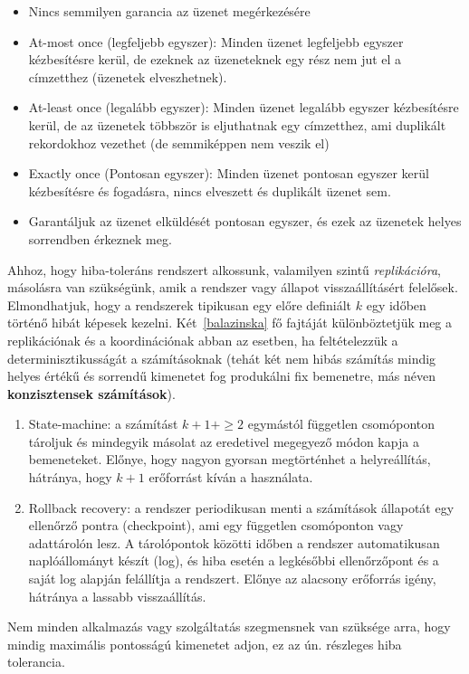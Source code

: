 \documentclass[a4paper,12pt]{article}
\begin{document}
\begin{itemize}
\item Nincs semmilyen garancia az üzenet megérkezésére
\item At-most once (legfeljebb egyszer): Minden üzenet legfeljebb egyszer kézbesítésre kerül, de ezeknek az üzeneteknek egy rész nem jut el a címzetthez (üzenetek elveszhetnek).
\item At-least once (legalább egyszer): Minden üzenet legalább egyszer kézbesítésre kerül, de az üzenetek többször is eljuthatnak egy címzetthez, ami duplikált rekordokhoz vezethet (de semmiképpen nem veszik el)
\item Exactly once (Pontosan egyszer): Minden üzenet pontosan egyszer kerül kézbesítésre és fogadásra, nincs elveszett és duplikált üzenet sem.
\item Garantáljuk az üzenet elküldését pontosan egyszer, és ezek az üzenetek helyes sorrendben érkeznek meg.
\end{itemize}

Ahhoz, hogy hiba-toleráns rendszert alkossunk, valamilyen szintű \textit{replikációra}, másolásra van szükségünk, amik a rendszer vagy állapot visszaállításért felelősek. Elmondhatjuk, hogy a rendszerek tipikusan egy előre definiált $k$ egy időben történő hibát képesek kezelni. Két~\ref{balazinska} fő fajtáját különböztetjük meg a replikációnak és a koordinációnak abban az esetben, ha feltételezzük a determinisztikusságát a számításoknak (tehát két nem hibás számítás mindig helyes értékű és sorrendű kimenetet fog produkálni fix bemenetre, más néven \textbf{konzisztensek számítások}). 

\begin{enumerate}
\item State-machine: a számítást $k+1+\ge2$ egymástól független csomóponton tároljuk és mindegyik másolat az eredetivel megegyező módon kapja a bemeneteket. Előnye, hogy nagyon gyorsan megtörténhet a helyreállítás, hátránya, hogy $k+1$ erőforrást kíván a használata.
\item Rollback recovery: a rendszer periodikusan menti a számítások állapotát egy ellenőrző pontra (checkpoint), ami egy független csomóponton vagy adattárolón lesz. A tárolópontok közötti időben a rendszer automatikusan naplóállományt készít (log), és hiba esetén a legkésőbbi ellenőrzőpont és a saját log alapján felállítja a rendszert. Előnye az alacsony erőforrás igény, hátránya a lassabb visszaállítás. 
\end{enumerate}

Nem minden alkalmazás vagy szolgáltatás szegmensnek van szüksége arra, hogy mindig maximális pontosságú kimenetet adjon, ez az ún. részleges hiba tolerancia. 
\end{document}
